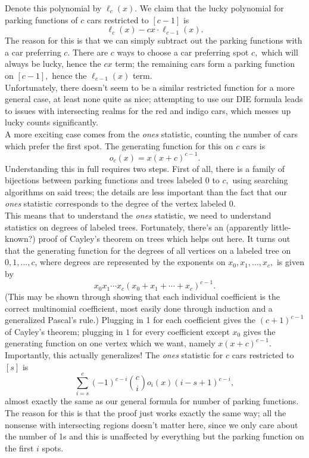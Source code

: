Denote this polynomial by $\ell_c(x).$ We claim that the lucky polynomial for parking functions of $c$ cars restricted to $[c-1]$ is $$\ell_c(x)-cx\cdot\ell_{c-1}(x).$$ The reason for this is that we can simply subtract out the parking functions with a car preferring $c.$ There are $c$ ways to choose a car preferring spot $c,$ which will always be lucky, hence the $cx$ term; the remaining cars form a parking function on $[c-1],$ hence the $\ell_{c-1}(x)$ term.\\

Unfortunately, there doesn't seem to be a similar restricted function for a more general case, at least none quite as nice; attempting to use our DIE formula leads to issues with intersecting realms for the red and indigo cars, which messes up lucky counts significantly.\\

A more exciting case comes from the \textit{ones} statistic, counting the number of cars which prefer the first spot. The generating function for this on $c$ cars is $$o_c(x)=x(x+c)^{c-1}.$$ Understanding this in full requires two steps. First of all, there is a family of bijections between parking functions and trees labeled $0$ to $c,$ using searching algorithms on said trees; the details are less important than the fact that our \textit{ones} statistic corresponds to the degree of the vertex labeled 0.\\

This means that to understand the \textit{ones} statistic, we need to understand statistics on degrees of labeled trees. Fortunately, there's an (apparently little-known?) proof of Cayley's theorem on trees which helps out here. It turns out that the generating function for the degrees of all vertices on a labeled tree on $0,1,...,c$, where degrees are represented by the exponents on $x_0,x_1,...,x_c,$ is given by $$x_0x_1\cdots x_c(x_0+x_1+\cdots+x_c)^{c-1}.$$ (This may be shown through showing that each individual coefficient is the correct multinomial coefficient, most easily done through induction and a generalized Pascal's rule.) Plugging in 1 for each coefficient gives the $(c+1)^{c-1}$ of Cayley's theorem; plugging in $1$ for every coefficient except $x_0$ gives the generating function on one vertex which we want, namely $x(x+c)^{c-1}.$\\

Importantly, this actually generalizes! The \textit{ones} statistic for $c$ cars restricted to $[s]$ is $$\sum_{i=s}^c (-1)^{c-i}\binom{c}{i}o_i(x)(i-s+1)^{c-i},$$ almost exactly the same as our general formula for number of parking functions. The reason for this is that the proof just works exactly the same way; all the nonsense with intersecting regions doesn't matter here, since we only care about the number of 1s and this is unaffected by everything but the parking function on the first $i$ spots.\\

